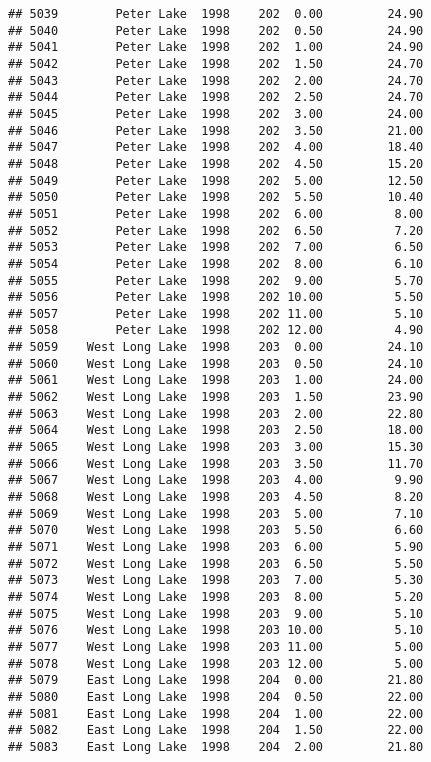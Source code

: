 \documentclass[
]{article}
\begin{document}
\begin{verbatim}
## 5039        Peter Lake  1998    202  0.00         24.90
## 5040        Peter Lake  1998    202  0.50         24.90
## 5041        Peter Lake  1998    202  1.00         24.90
## 5042        Peter Lake  1998    202  1.50         24.70
## 5043        Peter Lake  1998    202  2.00         24.70
## 5044        Peter Lake  1998    202  2.50         24.70
## 5045        Peter Lake  1998    202  3.00         24.00
## 5046        Peter Lake  1998    202  3.50         21.00
## 5047        Peter Lake  1998    202  4.00         18.40
## 5048        Peter Lake  1998    202  4.50         15.20
## 5049        Peter Lake  1998    202  5.00         12.50
## 5050        Peter Lake  1998    202  5.50         10.40
## 5051        Peter Lake  1998    202  6.00          8.00
## 5052        Peter Lake  1998    202  6.50          7.20
## 5053        Peter Lake  1998    202  7.00          6.50
## 5054        Peter Lake  1998    202  8.00          6.10
## 5055        Peter Lake  1998    202  9.00          5.70
## 5056        Peter Lake  1998    202 10.00          5.50
## 5057        Peter Lake  1998    202 11.00          5.10
## 5058        Peter Lake  1998    202 12.00          4.90
## 5059    West Long Lake  1998    203  0.00         24.10
## 5060    West Long Lake  1998    203  0.50         24.10
## 5061    West Long Lake  1998    203  1.00         24.00
## 5062    West Long Lake  1998    203  1.50         23.90
## 5063    West Long Lake  1998    203  2.00         22.80
## 5064    West Long Lake  1998    203  2.50         18.00
## 5065    West Long Lake  1998    203  3.00         15.30
## 5066    West Long Lake  1998    203  3.50         11.70
## 5067    West Long Lake  1998    203  4.00          9.90
## 5068    West Long Lake  1998    203  4.50          8.20
## 5069    West Long Lake  1998    203  5.00          7.10
## 5070    West Long Lake  1998    203  5.50          6.60
## 5071    West Long Lake  1998    203  6.00          5.90
## 5072    West Long Lake  1998    203  6.50          5.50
## 5073    West Long Lake  1998    203  7.00          5.30
## 5074    West Long Lake  1998    203  8.00          5.20
## 5075    West Long Lake  1998    203  9.00          5.10
## 5076    West Long Lake  1998    203 10.00          5.10
## 5077    West Long Lake  1998    203 11.00          5.00
## 5078    West Long Lake  1998    203 12.00          5.00
## 5079    East Long Lake  1998    204  0.00         21.80
## 5080    East Long Lake  1998    204  0.50         22.00
## 5081    East Long Lake  1998    204  1.00         22.00
## 5082    East Long Lake  1998    204  1.50         22.00
## 5083    East Long Lake  1998    204  2.00         21.80

\end{verbatim}
\end{document}
